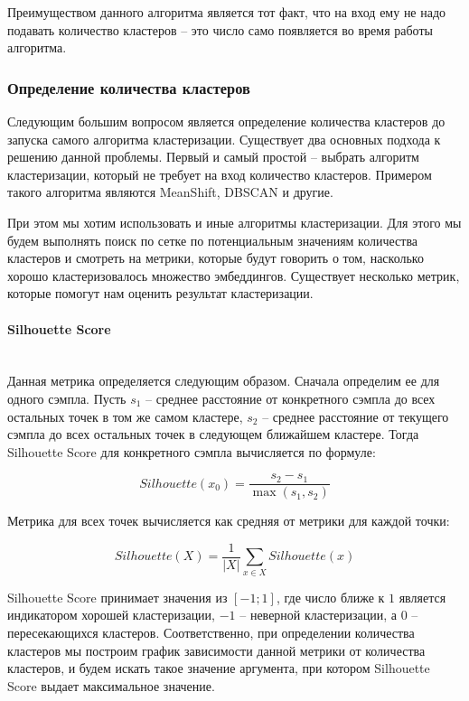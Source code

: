 Преимуществом данного алгоритма является тот факт, что на вход ему не надо подавать количество кластеров -- это число само появляется во время работы алгоритма.

\subsubsection{Определение количества кластеров}

Следующим большим вопросом является определение количества кластеров до запуска самого алгоритма кластеризации. Существует два основных подхода к решению данной проблемы. Первый и самый простой -- выбрать алгоритм кластеризации, который не требует на вход количество кластеров. Примером такого алгоритма являются MeanShift, DBSCAN и другие.

При этом мы хотим использовать и иные алгоритмы кластеризации. Для этого мы будем выполнять поиск по сетке по потенциальным значениям количества кластеров и смотреть на метрики, которые будут говорить о том, насколько хорошо кластеризовалось множество эмбеддингов. Существует несколько метрик, которые помогут нам оценить результат кластеризации.

\paragraph{Silhouette Score}\mbox{} \\

Данная метрика определяется следующим образом. Сначала определим ее для одного сэмпла. Пусть $s_1$ -- среднее расстояние от конкретного сэмпла до всех остальных точек в том же самом кластере, $s_2$ -- среднее расстояние от текущего сэмпла до всех остальных точек в следующем ближайшем кластере. Тогда Silhouette Score для конкретного сэмпла вычисляется по формуле:

$$
    Silhouette(x_0) = \frac{s_2 - s_1}{\max(s_1, s_2)}
$$
\smallskip

Метрика для всех точек вычисляется как средняя от метрики для каждой точки:

$$
    Silhouette(X) = \frac{1}{|X|} \sum_{x \in X} Silhouette(x)
$$
\smallskip

Silhouette Score принимает значения из $[-1; 1]$, где число ближе к $1$ является индикатором хорошей кластеризации, $-1$ -- неверной кластеризации, а $0$ -- пересекающихся кластеров. Соответственно, при определении количества кластеров мы построим график зависимости данной метрики от количества кластеров, и будем искать такое значение аргумента, при котором Silhouette Score выдает максимальное значение.

